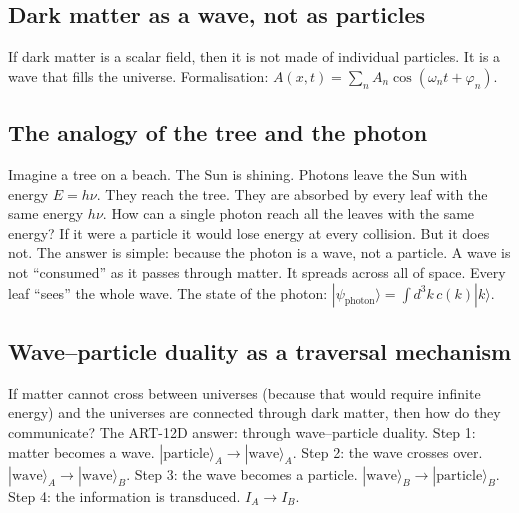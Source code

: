 \documentclass[11pt,a4paper]{article}
\begin{document}
\subsection{Dark matter as a wave, not as particles}
If dark matter is a scalar field, then it is not made of individual particles. It is a wave that fills the universe. Formalisation: $A(x,t) = \sum_n A_n \cos(\omega_n t + \varphi_n)$.

\subsection{The analogy of the tree and the photon}
Imagine a tree on a beach. The Sun is shining. Photons leave the Sun with energy $E = h\nu$. They reach the tree. They are absorbed by every leaf with the same energy $h\nu$. How can a single photon reach all the leaves with the same energy? If it were a particle it would lose energy at every collision. But it does not. The answer is simple: because the photon is a wave, not a particle. A wave is not ``consumed'' as it passes through matter. It spreads across all of space. Every leaf ``sees'' the whole wave. The state of the photon: $|\psi_{\text{photon}}\rangle = \int d^3k \, c(k) |k\rangle$.

\subsection{Wave--particle duality as a traversal mechanism}
If matter cannot cross between universes (because that would require infinite energy) and the universes are connected through dark matter, then how do they communicate? The ART-12D answer: through wave--particle duality. Step 1: matter becomes a wave. $|\text{particle}\rangle_A \to |\text{wave}\rangle_A$. Step 2: the wave crosses over. $|\text{wave}\rangle_A \to |\text{wave}\rangle_B$. Step 3: the wave becomes a particle. $|\text{wave}\rangle_B \to |\text{particle}\rangle_B$. Step 4: the information is transduced. $I_A \to I_B$.
\end{document}
